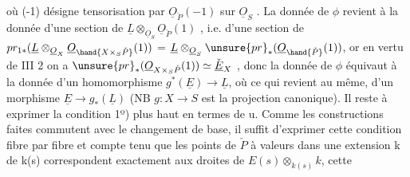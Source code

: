 où (-1) désigne  tensorisation par $\underline{O}_{\check{P}}(-1)$ sur $\underline{O}_S$ . La donnée de $\phi$
revient à la donnée d'une section de $\underline{L}\otimes_{\underline{O}_S}\underline{O}_{\check{P}}(1)$ , i.e. d'une section
de $pr_{1*}(\underline{L}\otimes_{\underline{O}_X}\underline{O}_{\hand{X\times_S\check{P}}}(1))$ = $\underline{L}\otimes_{\underline{O}_S}\unsure{pr}_*(\underline{O}_{\hand{\check{P}}}(1))$, 
 or en vertu de III 2 on a $\unsure{pr}_*(\underline{O}_{X\times_S\check{P}}(1))\simeq\check{\underline{E}}_X$ , donc
la donnée de $\phi$ équivaut à  la donnée d'un homomorphisme $g^*(\underline{E})\to\underline{L}$,
où ce qui revient au même, d'un morphisme  $\underline{E}\to g_*(\underline{L})$ (NB $g:X\to S$ est
la projection canonique). Il reste à exprimer la condition 1º) plus
haut en termes de u. Comme les constructions faites commutent avec le
changement de base, il suffit d'exprimer cette condition fibre par fibre\hand{,}
et compte tenu que les points de $\check{P}$ à valeurs dans une extension k de
k(s) correspondent exactement aux droites de $E(s)\otimes_{k(s)}k$, cette

